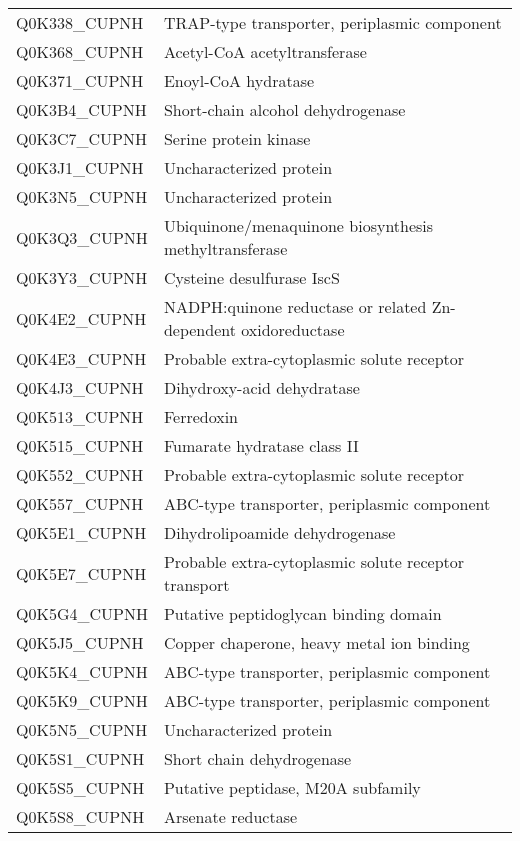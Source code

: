 \begin{center}
\begin{longtable}{ l l }
Q0K338\_CUPNH & TRAP-type transporter, periplasmic component \\ [0.5ex]
Q0K368\_CUPNH & Acetyl-CoA acetyltransferase \\ [0.5ex]
Q0K371\_CUPNH & Enoyl-CoA hydratase \\ [0.5ex]
Q0K3B4\_CUPNH & Short-chain alcohol dehydrogenase \\ [0.5ex]
Q0K3C7\_CUPNH & Serine protein kinase \\ [0.5ex]
Q0K3J1\_CUPNH & Uncharacterized protein \\ [0.5ex]
Q0K3N5\_CUPNH & Uncharacterized protein \\ [0.5ex]
Q0K3Q3\_CUPNH & Ubiquinone/menaquinone biosynthesis methyltransferase \\ [0.5ex]
Q0K3Y3\_CUPNH & Cysteine desulfurase IscS \\ [0.5ex]
Q0K4E2\_CUPNH & NADPH:quinone reductase or related Zn-dependent oxidoreductase \\ [0.5ex]
Q0K4E3\_CUPNH & Probable extra-cytoplasmic solute receptor \\ [0.5ex]
Q0K4J3\_CUPNH & Dihydroxy-acid dehydratase \\ [0.5ex]
Q0K513\_CUPNH & Ferredoxin \\ [0.5ex]
Q0K515\_CUPNH & Fumarate hydratase class II \\ [0.5ex]
Q0K552\_CUPNH & Probable extra-cytoplasmic solute receptor \\ [0.5ex]
Q0K557\_CUPNH & ABC-type transporter, periplasmic component \\ [0.5ex]
Q0K5E1\_CUPNH & Dihydrolipoamide dehydrogenase \\ [0.5ex]
Q0K5E7\_CUPNH & Probable extra-cytoplasmic solute receptor transport \\ [0.5ex]
Q0K5G4\_CUPNH & Putative peptidoglycan binding domain \\ [0.5ex]
Q0K5J5\_CUPNH & Copper chaperone, heavy metal ion binding \\ [0.5ex]
Q0K5K4\_CUPNH & ABC-type transporter, periplasmic component \\ [0.5ex]
Q0K5K9\_CUPNH & ABC-type transporter, periplasmic component \\ [0.5ex]
Q0K5N5\_CUPNH & Uncharacterized protein \\ [0.5ex]
Q0K5S1\_CUPNH & Short chain dehydrogenase \\ [0.5ex]
Q0K5S5\_CUPNH & Putative peptidase, M20A subfamily \\ [0.5ex]
Q0K5S8\_CUPNH & Arsenate reductase \\ [0.5ex]

\end{longtable}
\end{center}
